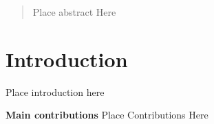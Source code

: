 \documentclass{egpubl}
\renewcommand{\paragraph}[1]{\noindent \textbf{#1}}
\begin{document}
\maketitle

\begin{abstract}
Place abstract Here \\


\begin{classification} %
\end{classification}

\end{abstract}


\section{Introduction}
\label{sec:intro}

Place introduction here


\paragraph{Main contributions} Place Contributions Here 
\end{document}
